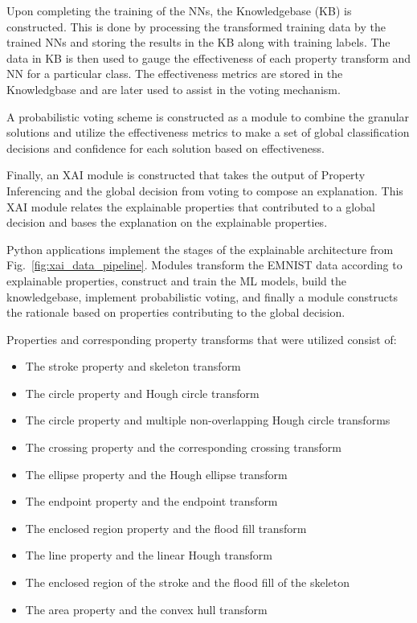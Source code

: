 \documentclass[conference]{IEEEtran}
\begin{document}
Upon completing the training of the NNs, the Knowledgebase (KB) is constructed.
This is done by processing the transformed training data by the trained NNs and
storing the results in the KB along with training labels.  The data in KB is
then used to gauge the effectiveness of each property transform and NN for a
particular class.  The effectiveness metrics are stored in the Knowledgbase and
are later used to assist in the voting mechanism.

A probabilistic voting scheme is constructed as a module to combine the granular
solutions and utilize the effectiveness metrics to make a set of
global classification decisions and confidence for each solution based on
effectiveness.

Finally, an XAI module is constructed that takes the output of Property
Inferencing and the global decision from voting to compose an explanation.
This XAI module relates the explainable properties that contributed to a global
decision and bases the explanation on the explainable properties.

Python applications implement the stages of the explainable architecture from
Fig.~\ref{fig:xai_data_pipeline}. Modules transform the EMNIST data according to
explainable properties, construct and train the ML models, build the
knowledgebase, implement probabilistic voting, and finally a module
constructs the rationale based on properties contributing to the global
decision.

Properties and corresponding property transforms that were utilized consist of:
\begin{itemize}
    \item The stroke property and skeleton transform
    \item The circle property and Hough circle transform
    \item The circle property and multiple non-overlapping Hough circle transforms
    \item The crossing property and the corresponding crossing transform
    \item The ellipse property and the Hough ellipse transform
    \item The endpoint property and the endpoint transform
    \item The enclosed region property and the flood fill transform
    \item The line property and the linear Hough transform
    \item The enclosed region of the stroke and the flood fill of the skeleton
    \item The area property and the convex hull transform
\end{itemize}
\end{document}
